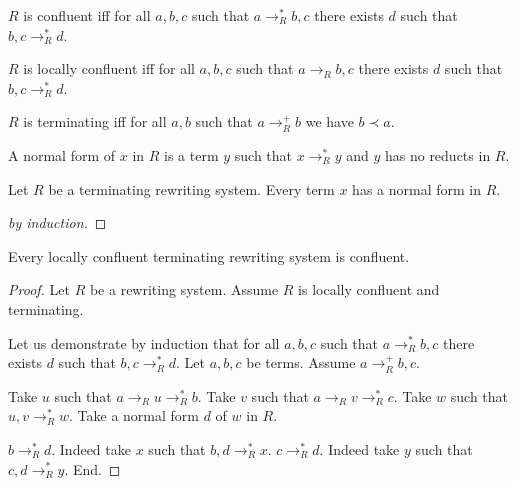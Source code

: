 \documentclass{article}
\newcommand{\reduces}[1]{\to_{#1}}
\newcommand{\reducesTC}[1]{\to_{#1}^{+}}
\newcommand{\reducesTCR}[1]{\to_{#1}^{*}}
\begin{document}
\begin{forthel}
    \begin{definition}
      $R$ is confluent iff for all $a,b,c$ such that $a \reducesTCR{R} b,c$ there exists $d$ such that $b,c \reducesTCR{R} d$.
    \end{definition}

    \begin{definition}
      $R$ is locally confluent iff for all $a, b, c$ such that
      $a \reduces{R} b, c$
      there exists $d$ such that $b, c \reducesTCR{R} d$.
    \end{definition}

    \begin{definition}[Terminating]
      $R$ is terminating iff
      for all $a, b$ such that $a \reducesTC{R} b$ we have $b \prec a$.
    \end{definition}

    \begin{definition}
      A normal form of $x$ in $R$ is a term $y$ such that
      $x \reducesTCR{R} y$ and $y$ has no reducts in $R$.
    \end{definition}

    \begin{lemma}
      Let $R$ be a terminating rewriting system.
      Every term $x$ has a normal form in $R$.
    \end{lemma}
    \begin{proof}[by induction]
    \end{proof}


    \begin{lemma}[Newman]
      Every locally confluent terminating rewriting system is confluent.
    \end{lemma}
    \begin{proof}
      Let $R$ be a rewriting system. Assume $R$ is locally confluent and
      terminating.

      Let us demonstrate by induction that for all $a,b,c$ such that $a \reducesTCR{R} b,c$ there exists $d$ such that $b,c \reducesTCR{R} d$.
        Let $a,b,c$ be terms. Assume $a \reducesTC{R} b,c$.

        Take $u$ such that $a \reduces{R} u \reducesTCR{R} b$.
        Take $v$ such that $a \reduces{R} v \reducesTCR{R} c$.
        Take $w$ such that $u,v \reducesTCR{R} w$.
        Take a normal form $d$ of $w$ in $R$.

        $b \reducesTCR{R} d$. Indeed take $x$ such that $b,d \reducesTCR{R} x$. 
        $c \reducesTCR{R} d$. Indeed take $y$ such that $c,d \reducesTCR{R} y$.
      End.
    \end{proof}
  \end{forthel}
\end{document}
